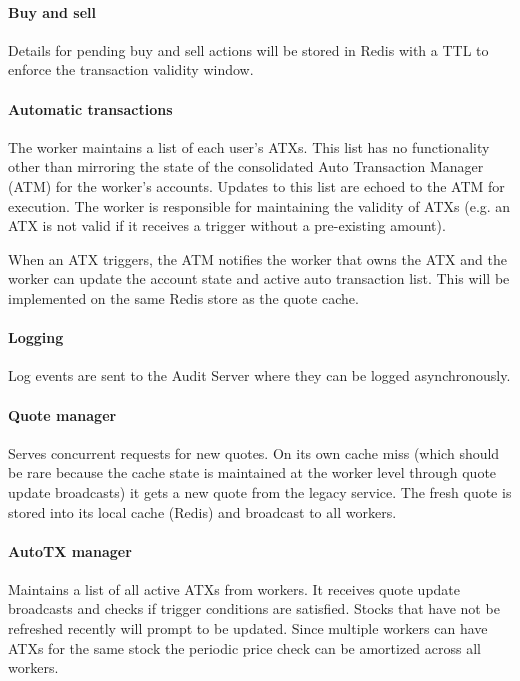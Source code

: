 \paragraph{Buy and sell}
Details for pending buy and sell actions will be stored in Redis with a TTL to enforce the transaction validity window.

\paragraph{Automatic transactions}
The worker maintains a list of each user's ATXs. This list has no functionality other than mirroring the state of the consolidated Auto Transaction Manager (ATM) for the worker's accounts. Updates to this list are echoed to the ATM for execution. The worker is responsible for maintaining the validity of ATXs (e.g. an ATX is not valid if it receives a trigger without a pre-existing amount).

When an ATX triggers, the ATM notifies the worker that owns the ATX and the worker can update the account state and active auto transaction list. This will be implemented on the same Redis store as the quote cache.

\paragraph{Logging}
Log events are sent to the Audit Server where they can be logged asynchronously.

\paragraph{Quote manager}
Serves concurrent requests for new quotes. On its own cache miss (which should be rare because the cache state is maintained at the worker level through quote update broadcasts) it gets a new quote from the legacy service. The fresh quote is stored into its local cache (Redis) and broadcast to all workers.

\paragraph{AutoTX manager}
Maintains a list of all active ATXs from workers. It receives quote update broadcasts and checks if trigger conditions are satisfied. Stocks that have not be refreshed recently will prompt to be updated. Since multiple workers can have ATXs for the same stock the periodic price check can be amortized across all workers.

